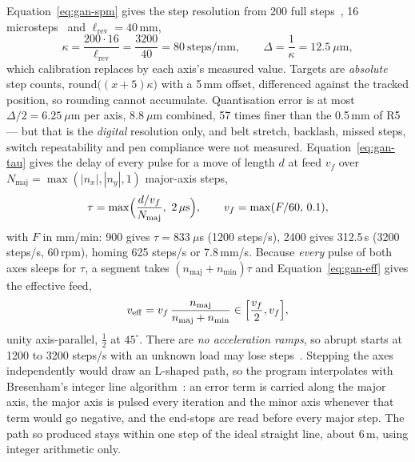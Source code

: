 Equation~\ref{eq:gan-spm} gives the step resolution from 200 full steps~\cite{stepperds}, 16 microsteps~\cite[p.~6]{a4988ds} and $\ell_{\mathrm{rev}}=40$\,mm,
\begin{equation}
\kappa=\frac{200\cdot16}{\ell_{\mathrm{rev}}}=\frac{3200}{40}=80\ \mathrm{steps/mm},\qquad\Delta=\frac1\kappa=12.5\ \mu\mathrm{m},
\label{eq:gan-spm}
\end{equation}
which calibration replaces by each axis's measured value. Targets are \emph{absolute} step counts, $\mathrm{round}\bigl((x+5)\kappa\bigr)$ with a 5\,mm offset, differenced against the tracked position, so rounding cannot accumulate. Quantisation error is at most $\Delta/2=6.25\ \mu$m per axis, $8.8\ \mu$m combined, 57 times finer than the 0.5\,mm of R5 --- but that is the \emph{digital} resolution only, and belt stretch, backlash, missed steps, switch repeatability and pen compliance were not measured.
Equation~\ref{eq:gan-tau} gives the delay of every pulse for a move of length $d$ at feed $v_f$ over $N_{\mathrm{maj}}=\max(|n_x|,|n_y|,1)$ major-axis steps,
\begin{equation}
\tau=\max\Bigl(\frac{d/v_f}{N_{\mathrm{maj}}},\ 2\,\mu\mathrm s\Bigr),\qquad v_f=\max(F/60,\,0.1),
\label{eq:gan-tau}
\end{equation}
with $F$ in mm/min: 900 gives $\tau=833\ \mu$s (1200 steps/s), 2400 gives 312.5\,\textmu s (3200 steps/s, 60\,rpm), homing 625 steps/s or 7.8\,mm/s. Because \emph{every} pulse of both axes sleeps for $\tau$, a segment takes $(n_{\mathrm{maj}}+n_{\mathrm{min}})\tau$ and Equation~\ref{eq:gan-eff} gives the effective feed,
\begin{equation}
v_{\mathrm{eff}}=v_f\,\frac{n_{\mathrm{maj}}}{n_{\mathrm{maj}}+n_{\mathrm{min}}}\in\Bigl[\frac{v_f}{2},v_f\Bigr],
\label{eq:gan-eff}
\end{equation}
unity axis-parallel, $\tfrac12$ at $45^\circ$. There are \emph{no acceleration ramps}, so abrupt starts at 1200 to 3200 steps/s with an unknown load may lose steps~\cite{acarnley2002}. Stepping the axes independently would draw an L-shaped path, so the program interpolates with Bresenham's integer line algorithm~\cite{bresenham1965}: an error term is carried along the major axis, the major axis is pulsed every iteration and the minor axis whenever that term would go negative, and the end-stops are read before every major step. The path so produced stays within one step of the ideal straight line, about 6\,\textmu m, using integer arithmetic only.

